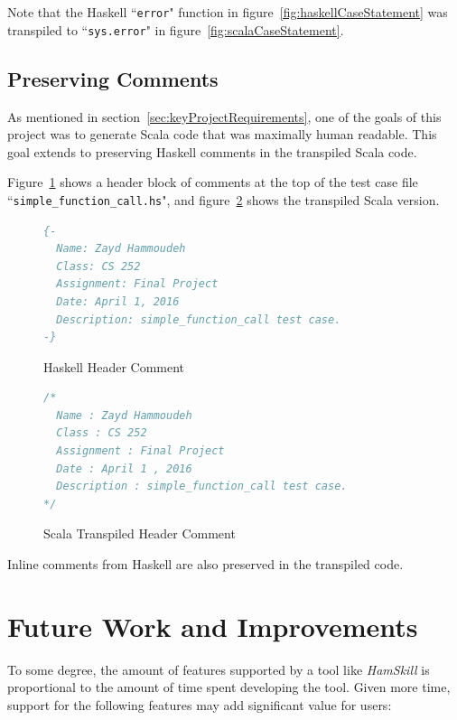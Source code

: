 \documentclass{report}
\begin{document}
Note that the Haskell ``\texttt{error}" function in figure~\ref{fig:haskellCaseStatement} was transpiled to ``\texttt{sys.error}" in figure~\ref{fig:scalaCaseStatement}.

\subsection{Preserving Comments}\label{sec:preservingComments}

As mentioned in section~\ref{sec:keyProjectRequirements}, one of the goals of this project was to generate Scala code that was maximally human readable.  This goal extends to preserving Haskell comments in the transpiled Scala code.

Figure~\ref{fig:haskellHeaderComments} shows a header block of comments at the top of the test case file ``\texttt{simple\_function\_call.hs}", and figure~\ref{fig:scalaHeaderComments} shows the transpiled Scala version.  

\begin{figure}[H]
\begin{mdframed}
\begin{lstlisting}[language=Haskell]
{-
  Name: Zayd Hammoudeh
  Class: CS 252
  Assignment: Final Project
  Date: April 1, 2016
  Description: simple_function_call test case.
-}
\end{lstlisting}
\end{mdframed}
\caption{Haskell Header Comment}\label{fig:haskellHeaderComments}
\end{figure}

\begin{figure}[H]
\begin{mdframed}
\begin{lstlisting}[language=Scala]
/*
  Name : Zayd Hammoudeh
  Class : CS 252
  Assignment : Final Project
  Date : April 1 , 2016
  Description : simple_function_call test case.
*/
\end{lstlisting}
\end{mdframed}
\caption{Scala Transpiled Header Comment}\label{fig:scalaHeaderComments}
\end{figure}

Inline comments from Haskell are also preserved in the transpiled code.

\section{Future Work and Improvements}

To some degree, the amount of features supported by a tool like \textit{HamSkill} is proportional to the amount of time spent developing the tool.  Given more time, support for the following features may add significant value for users:
\end{document}
